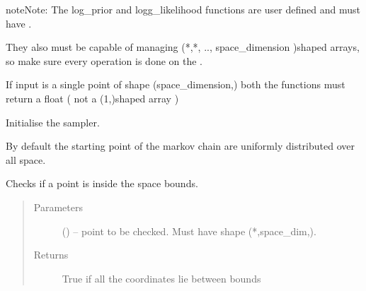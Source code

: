 \documentclass[letterpaper,10pt,english,openany,oneside]{sphinxmanual}
\begin{document}
\begin{fulllineitems}
\begin{fulllineitems}
\begin{quote}
\begin{description}
\end{description}\end{quote}

\end{fulllineitems}


\begin{sphinxadmonition}{note}{Note:}
The log\_prior and logg\_likelihood functions are user defined and must have .

They also must be capable of managing (*,*, .., space\_dimension )\sphinxhyphen{}shaped arrays,
so make sure every operation is done on the .

If input is a single point of shape (space\_dimension,) both the functions
must return a float ( not a (1,)\sphinxhyphen{}shaped array )
\end{sphinxadmonition}

\begin{fulllineitems}
\label{\detokenize{autogen:model.Model.__init__}}
Initialise the sampler.

By default the starting point of the markov chain are uniformly distributed over all space.

\end{fulllineitems}


\begin{fulllineitems}
\label{\detokenize{autogen:model.Model.is_inside_bounds}}
Checks if a point is inside the space bounds.
\begin{quote}\begin{description}
\item[{Parameters}] \leavevmode
{} () – point to be checked. Must have shape (*,space\_dim,).

\item[{Returns}] \leavevmode

True if all the coordinates lie between bounds
\begin{quote}


\end{quote}
\end{description}
\end{quote}
\end{fulllineitems}
\end{fulllineitems}
\end{document}
